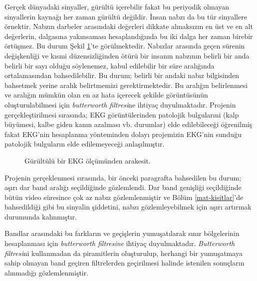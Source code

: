 \documentclass[a4paper, 12pt]{article}
\begin{document}
Gerçek dünyadaki sinyaller, gürültü içerebilir fakat bu periyodik olmayan sinyallerin kaynağı her zaman gürültü değildir\cite{periyot}. İnsan nabzı da bu tür sinyallere örnektir. Nabzın darbeler arasındaki değerleri dikkate almaksızın en üst ve en alt değerlerin,  dalgasına yakınsaması hesaplandığında bu iki dalga her zaman birebir örtüşmez. Bu durum Şekil \ref{ecg-ornek}'te görülmektedir. Nabızlar arasında geçen sürenin değişkenliği ve kısmi düzensizliğinden ötürü bir insanın nabzının belirli bir anda belirli bir sayı olduğu söylenemez, kabul edilebilir bir süre aralığında ortalamasından bahsedilebilir.\cite{hall_guyton_2010} Bu durum; belirli bir andaki nabız bilgisinden bahsetmek yerine aralık belirtmemizi gerektirmektedir. Bu aralığın belirlenmesi ve aralığın mümkün olan en az hata içerecek şekilde görüntüsünün oluşturulabilmesi için \textit{butterworth filtresi}ne ihtiyaç duyulmaktadır. Projenin gerçekleştirilmesi sırasında; EKG görüntülerinden patolojik bulgularıni (kalp büyümesi, kalbe giden kanın azalması vb. durumlar) elde edilebileceği öğrenilmiş fakat EKG'nin hesaplanma yönteminden dolayı projemizin EKG'nin sunduğu patolojik bulguların elde edilemeyeceği anlaşılmıştır.


\begin{figure}[h]
\centering
{}
\caption{Gürültülü bir EKG ölçümünden arakesit.\cite{ekg} } 
\label{ecg-ornek}
\end{figure}


Projenin gerçeklenmesi sırasında, bir önceki paragrafta bahsedilen bu durum; aşırı dar band aralığı seçildiğinde gözlemlendi. Dar band genişliği seçildiğinde bütün video süresince çok az nabız gözlemlenmiştir ve Bölüm \ref{mat-kisitlar}'de bahsedildiği gibi bu sinyalin şiddetini, nabzı gözlemleyebilmek için aşırı artırmak durumunda kalınmıştır.


Bandlar arasındaki bu farkların ve geçişlerin yumuşatılarak sınır bölgelerinin hesaplanması için \textit{butterworth filtresine} ihtiyaç duyulmaktadır. \textit{Butterworth filtresi}ni kullanmadan da piramitlerin oluşturulup, herhangi bir yumuşatmaya sahip olmayan band geçiren filtrelerden geçirilmesi halinde istenilen sonuçların alınmadığı gözlemlenmiştir.
\end{document}
